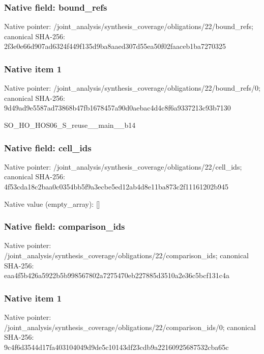 \documentclass[10pt,a4paper]{article}
\begin{document}
\subsubsection{Native field: bound\_\allowbreak{}refs}
Native pointer: /joint\_\allowbreak{}analysis/synthesis\_\allowbreak{}coverage/obligations/22/bound\_\allowbreak{}refs; canonical SHA-256: 2f3e0e66d907ad6324f449f135d9ba8aaed307d55ea50f02faaceb1ba7270325

\subsubsection{Native item 1}
Native pointer: /joint\_\allowbreak{}analysis/synthesis\_\allowbreak{}coverage/obligations/22/bound\_\allowbreak{}refs/0; canonical SHA-256: 9d49ad9e5587ad73868b47fb1678457a90d0aebac4d4c8f6a9337213c93b7130

\begingroup\raggedright\sloppy SO\_\allowbreak{}HO\_\allowbreak{}HOS06\_\allowbreak{}S\_\allowbreak{}reuse\_\allowbreak{}\_\allowbreak{}main\_\allowbreak{}\_\allowbreak{}b14\par\endgroup

\subsubsection{Native field: cell\_\allowbreak{}ids}
Native pointer: /joint\_\allowbreak{}analysis/synthesis\_\allowbreak{}coverage/obligations/22/cell\_\allowbreak{}ids; canonical SHA-256: 4f53cda18c2baa0c0354bb5f9a3ecbe5ed12ab4d8e11ba873c2f11161202b945

Native value (empty\_\allowbreak{}array): []

\subsubsection{Native field: comparison\_\allowbreak{}ids}
Native pointer: /joint\_\allowbreak{}analysis/synthesis\_\allowbreak{}coverage/obligations/22/comparison\_\allowbreak{}ids; canonical SHA-256: eaa4f5b426a5922b5b998567802a7275470eb227885d3510a2e36c5bcf131c4a

\subsubsection{Native item 1}
Native pointer: /joint\_\allowbreak{}analysis/synthesis\_\allowbreak{}coverage/obligations/22/comparison\_\allowbreak{}ids/0; canonical SHA-256: 9c4f6d3544d17fa403104049d9de5c10143df23cdb9a22160925687532cba65c
\end{document}
